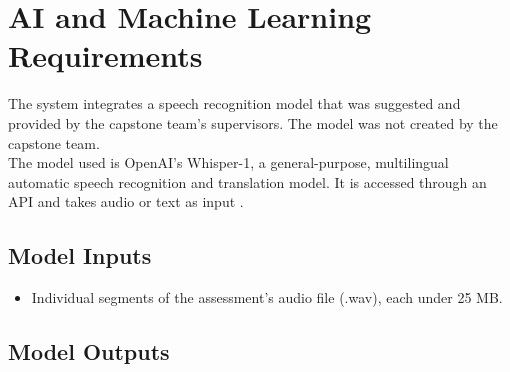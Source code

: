 \documentclass[12pt]{article}
\begin{document}
\section{AI and Machine Learning Requirements} \label{sec:AIML}

The system integrates a speech recognition model that was suggested and provided by the capstone team’s supervisors. 
The model was not created by the capstone team. \\

The model used is OpenAI’s Whisper-1, a general-purpose, multilingual automatic speech recognition and translation model. 
It is accessed through an API and takes audio or text as input \citep{OpenAI_Whisper}.

\subsection{Model Inputs}

\begin{itemize}
  \item Individual segments of the assessment’s audio file (.wav), each under 25 MB.
\end{itemize}

\subsection{Model Outputs} \label{sec:AIModelOutputs}
\end{document}
